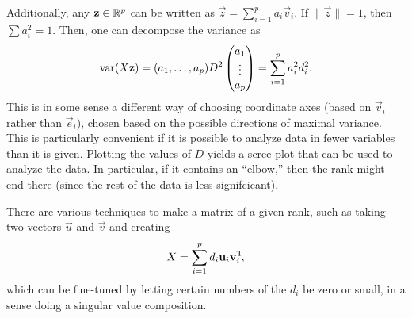 Additionally, any $\mathbf z\in \mathbb{R}^p$ can be written as $\vec z = \sum_{i=1}^p a_i\vec v_i$. If $\|\vec z\| = 1$, then $\sum a_i^2 = 1$. Then, one can decompose the variance as 
\[\operatorname{var}(X\mathbf z) = (a_1,\dots,a_p)D^2\begin{pmatrix}a_1\\\vdots\\a_p\end{pmatrix} = \sum_{i=1}^p a_i^2d_i^2.\]
This is in some sense a different way of choosing coordinate axes (based on $\vec v_i$ rather than $\vec e_i$), chosen based on the possible directions of maximal variance. This is particularly convenient if it is possible to analyze data in fewer variables than it is given. Plotting the values of $D$ yields a scree plot that can be used to analyze the data. In particular, if it contains an ``elbow,'' then the rank might end there (since the rest of the data is less signifcicant).

There are various techniques to make a matrix of a given rank, such as taking two vectors $\vec u$ and $\vec v$ and creating
\[X = \sum_{i=1}^p d_i\mathbf u_i\mathbf v_i^{\mathrm{T}}\!,\]
which can be fine-tuned by letting certain numbers of the $d_i$ be zero or small, in a sense doing a singular value composition.
